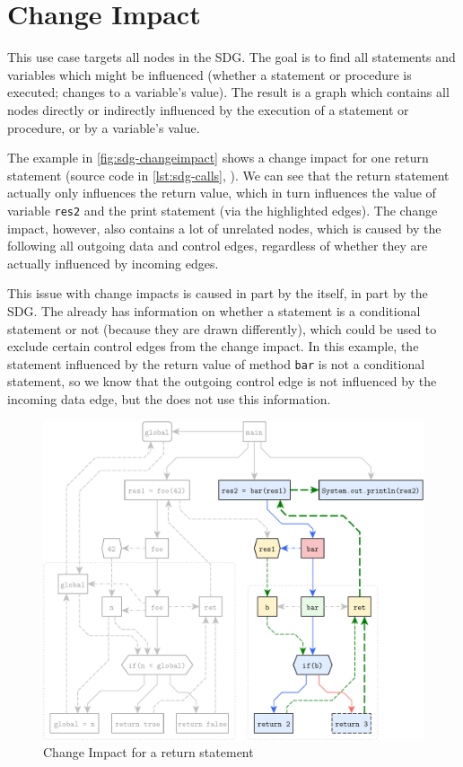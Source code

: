 \section{Change Impact}

This use case targets all nodes in the SDG. The goal is to find all statements and variables which might be influenced 
(whether a statement or procedure is executed; changes to a variable's value). The result is a graph which contains all 
nodes directly or indirectly influenced by the execution of a statement or procedure, or by a variable's value.

The example in \autoref{fig:sdg-changeimpact} shows a change impact for one return statement (source code in 
\autoref{lst:sdg-calls}, ). We can see that the return statement actually only influences 
the return value, which in turn influences the value of variable \lstinline|res2| and the print statement (via the 
highlighted edges). The change impact, however, also contains a lot of unrelated nodes, which is caused by the \SB 
following all outgoing data and control edges, regardless of whether they are actually influenced by incoming edges.

This issue with change impacts is caused in part by the \SB itself, in part by the SDG. The \SB already has information 
on whether a statement is a conditional statement or not (because they are drawn differently), which could be used to 
exclude certain control edges from the change impact. In this example, the statement influenced by the return value of 
method \lstinline|bar| is not a conditional statement, so we know that the outgoing control edge is not influenced by 
the incoming data edge, but the \SB does not use this information.

\begin{figure}[hp]
  \centering
    \includegraphics[scale=0.6]{sdgs/changeimpact}
  \caption{Change Impact for a return statement}
  \label{fig:sdg-changeimpact}
\end{figure}

